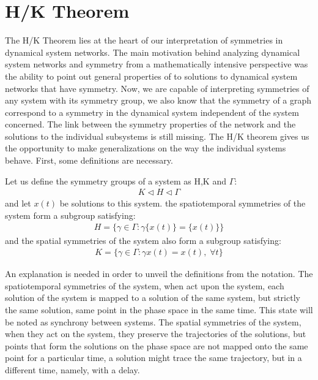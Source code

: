 \section{H/K Theorem}

The H/K Theorem lies at the heart of our interpretation of symmetries in dynamical system networks. The main motivation behind analyzing dynamical system networks and symmetry from a mathematically intensive perspective was the ability to point out general properties of to solutions to dynamical system networks that have symmetry. Now, we are capable of interpreting symmetries of any system with its symmetry group, we also know that the symmetry of a graph correspond to a symmetry in the dynamical system independent of the system concerned. The link between the symmetry properties of the network and the solutions to the individual subsystems is still missing. The H/K theorem gives us the opportunity to make generalizations on the way the individual systems behave. First, some definitions are necessary. \cite{golubitsky_symmetry_2003}

\begin{definition}
\label{def:h_and_k}
Let us define the symmetry groups of a system as H,K and $\Gamma $:
\begin{align}
 K \triangleleft H \triangleleft \Gamma 
\end{align}
and let $x(t)$ be solutions to this system.
the spatiotemporal symmetries of the system form a subgroup satisfying:
\begin{align}
\label{eq:h}
H = \{ \gamma  \in \Gamma : \gamma  \{x(t)\} = \{x(t)\} \}
\end{align}
and the spatial symmetries of the system also form a subgroup satisfying:
\begin{align}
\label{eq:k}
K = \{ \gamma  \in \Gamma : \gamma  x(t) = x(t) , \; \forall t\}
\end{align}
\end{definition}

An explanation is needed in order to unveil the definitions from the notation. The spatiotemporal symmetries of the system, when act upon the system, each solution of the system is mapped to a solution of the same system, but strictly the same solution, same point in the phase space in the same time. This state will be noted as synchrony between systems. The spatial symmetries of the system, when they act on the system, they preserve the trajectories of the solutions, but points that form the solutions on the phase space are not mapped onto the same point for a particular time, a solution might trace the same trajectory, but in a different time, namely, with a delay.

